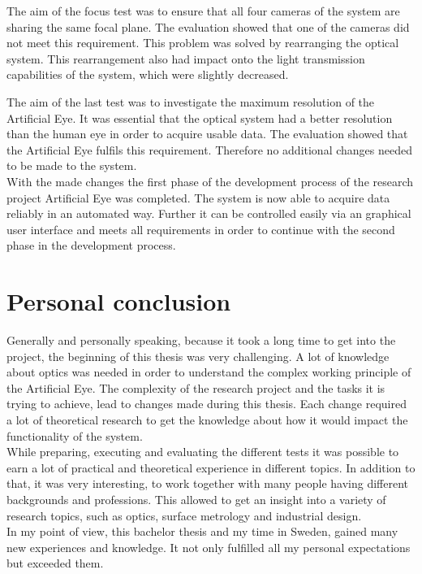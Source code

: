 The aim of the focus test was to ensure that all four cameras of the system are sharing the same focal plane. The evaluation showed that one of the cameras did not meet this requirement. This problem was solved by rearranging the optical system. This rearrangement also had impact onto the light transmission capabilities of the system, which were slightly decreased. 

The aim of the last test was to investigate the maximum resolution of the Artificial Eye. It was essential that the optical system had a better resolution than the human eye in order to acquire usable data. The evaluation showed that the Artificial Eye fulfils this requirement. Therefore no additional changes needed to be made to the system.\\

With the made changes the first phase of the development process of the research project Artificial Eye was completed. The system is now able to acquire data reliably in an automated way. Further it can be controlled easily via an graphical user interface and meets all requirements in order to continue with the second phase in the development process.\\


\section{Personal conclusion}

Generally and personally speaking, because it took a long time to get into the project, the beginning of this thesis was very challenging. A lot of knowledge about optics was needed in order to understand the complex working principle of the Artificial Eye. The complexity of the research project and the tasks it is trying to achieve, lead to changes made during this thesis. Each change required a lot of theoretical research to get the knowledge about how it would impact the functionality of the system.\\

While preparing, executing and evaluating the different tests it was possible to earn a lot of practical and theoretical experience in different topics. In addition to that, it was very interesting, to work together with many people having different backgrounds and professions. This allowed to get an insight into a variety of research topics, such as optics, surface metrology and industrial design.\\

In my point of view, this bachelor thesis and my time in Sweden, gained many new experiences and knowledge. It not only fulfilled all my personal expectations but exceeded them.




